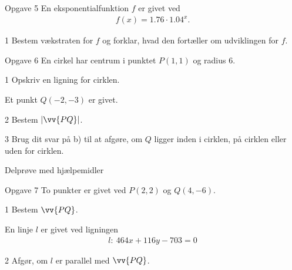\begin{opgavetekst}{Opgave 5}
	En eksponentialfunktion $f$ er givet ved
	\begin{align*}
		f(x) = 1.76\cdot 1.04^x.
	\end{align*}
\end{opgavetekst}
\begin{delopgave}{}{1}
	Bestem vækstraten for $f$ og forklar, hvad den fortæller om udviklingen for $f$.
\end{delopgave}
\begin{opgavetekst}{Opgave 6}
	En cirkel har centrum i punktet $P(1,1)$ og radius $6$.
\end{opgavetekst}
\begin{delopgave}{}{1}
	Opskriv en ligning for cirklen.
\end{delopgave}
\begin{meretekst}
	Et punkt $Q(-2,-3)$ er givet.
\end{meretekst}
\begin{delopgave}{}{2}
	Bestem $|\vv{PQ}|$.
\end{delopgave}
\begin{delopgave}{}{3}
	Brug dit svar på b) til at afgøre, om $Q$ ligger inden i cirklen, på cirklen eller uden for cirklen. 
\end{delopgave}
\newpage
\begin{center}
\LARGE
Delprøve med hjælpemidler 
\end{center}
\begin{opgavetekst}{Opgave 7}
	To punkter er givet ved $P(2,2)$ og $Q(4,-6)$. 
\end{opgavetekst}
\begin{delopgave}{}{1}
	Bestem $\vv{PQ}$.
\end{delopgave}
\begin{meretekst}
	En linje $l$ er givet ved ligningen
	\begin{align*}
		l:\ 464x+116y-703=0
	\end{align*}
\end{meretekst}
\begin{delopgave}{}{2}
	Afgør, om $l$ er parallel med $\vv{PQ}$. 
\end{delopgave}

